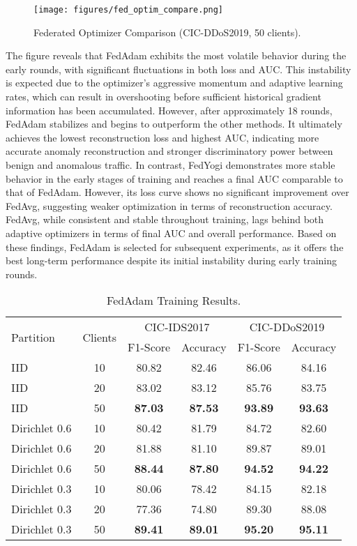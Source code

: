 \begin{figure}[h]
    \centering
    \texttt{[image: figures/fed\_optim\_compare.png]}
    \caption{Federated Optimizer Comparison (CIC-DDoS2019, 50 clients).}
    \label{fig:fed_optim_compare}
\end{figure}

The figure reveals that FedAdam exhibits the most volatile behavior during the early rounds, with significant fluctuations in both loss and AUC. This instability is expected due to the optimizer’s aggressive momentum and adaptive learning rates, which can result in overshooting before sufficient historical gradient information has been accumulated. However, after approximately 18 rounds, FedAdam stabilizes and begins to outperform the other methods. It ultimately achieves the lowest reconstruction loss and highest AUC, indicating more accurate anomaly reconstruction and stronger discriminatory power between benign and anomalous traffic. In contrast, FedYogi demonstrates more stable behavior in the early stages of training and reaches a final AUC comparable to that of FedAdam. However, its loss curve shows no significant improvement over FedAvg, suggesting weaker optimization in terms of reconstruction accuracy. FedAvg, while consistent and stable throughout training, lags behind both adaptive optimizers in terms of final AUC and overall performance. Based on these findings, FedAdam is selected for subsequent experiments, as it offers the best long-term performance despite its initial instability during early training rounds.

\begin{table}[h]
    \caption{FedAdam Training Results.}
    \centering
    \begin{tabular}{l|c|c|c|c|c}
        \multirow{2}{*}{Partition} & \multirow{2}{*}{Clients} & \multicolumn{2}{|c|}{CIC-IDS2017} & \multicolumn{2}{|c}{CIC-DDoS2019} \\
        \cline{3-6} & & F1-Score & Accuracy & F1-Score & Accuracy \\
        \hline\hline
        IID & 10 & 80.82 & 82.46 & 86.06 & 84.16 \\
        IID & 20 & 83.02 & 83.12 & 85.76 & 83.75 \\
        IID & 50 & \textbf{87.03} & \textbf{87.53} & \textbf{93.89} & \textbf{93.63} \\
        Dirichlet 0.6 & 10 & 80.42 & 81.79 & 84.72 & 82.60 \\
        Dirichlet 0.6 & 20 & 81.88 & 81.10 & 89.87 & 89.01 \\
        Dirichlet 0.6 & 50 & \textbf{88.44} & \textbf{87.80} & \textbf{94.52} & \textbf{94.22} \\
        Dirichlet 0.3 & 10 & 80.06 & 78.42 & 84.15 & 82.18 \\
        Dirichlet 0.3 & 20 & 77.36 & 74.80 & 89.30 & 88.08 \\
        Dirichlet 0.3 & 50 & \textbf{89.41} & \textbf{89.01} & \textbf{95.20} & \textbf{95.11} \\
    \end{tabular}
    \label{tbl:fedadam_results}
\end{table}

